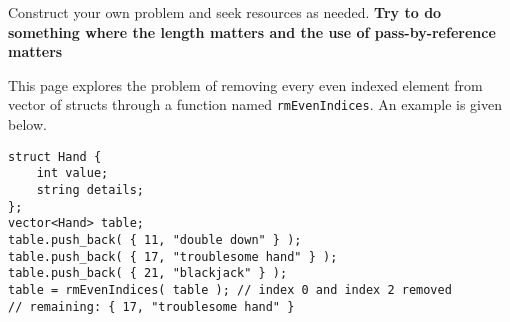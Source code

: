 \documentclass[addpoints,12pt]{exam}
\newcommand{\Soln}[1]{{\color{red}{SOLUTION: #1}}}%
\begin{document}
\begin{questions}
    \newpage

 Construct your own problem and seek resources as needed. \textbf{Try to do something where the length matters and the use of pass-by-reference matters}
    \newpage

 This page explores the problem of removing every even indexed element from vector of structs through a function named \texttt{rmEvenIndices}. An example is given below.
\begin{verbatim}
struct Hand {
    int value;
    string details; 
};    
vector<Hand> table;
table.push_back( { 11, "double down" } );
table.push_back( { 17, "troublesome hand" } );
table.push_back( { 21, "blackjack" } );
table = rmEvenIndices( table ); // index 0 and index 2 removed
// remaining: { 17, "troublesome hand" }
\end{verbatim}


\end{questions}
\end{document}
